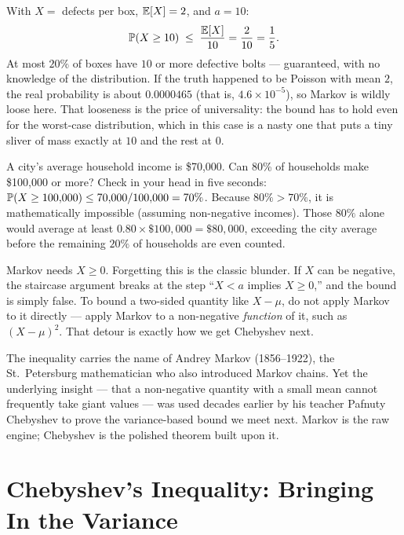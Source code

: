 \begin{example}
\label{ch19:ex-bolts}
With $X = $ defects per box, $\E[X]=2$, and $a=10$:
\[
  \P(X \ge 10) \;\le\; \frac{\E[X]}{10} = \frac{2}{10} = \frac15.
\]
At most $20\%$ of boxes have $10$ or more defective bolts --- guaranteed,
with no knowledge of the distribution. If the truth happened to be Poisson
with mean $2$, the real probability is about $0.0000465$ (that is,
$4.6\times 10^{-5}$), so Markov is wildly loose here. That looseness is the price of universality: the bound has to hold
even for the worst-case distribution, which in this case is a nasty one that
puts a tiny sliver of mass exactly at $10$ and the rest at $0$.
\end{example}

\begin{walkbox}
A city's average household income is \$70,000. Can 80\% of households make
\$100,000 or more? Check in your head in five seconds:
$\P(X \ge 100{,}000) \le 70{,}000 / 100{,}000 = 70\%$. Because $80\% > 70\%$,
it is mathematically impossible (assuming non-negative incomes). Those $80\%$
alone would average at least $0.80 \times \$100{,}000 = \$80{,}000$, exceeding
the city average before the remaining $20\%$ of households are even counted.
\end{walkbox}

\begin{trapbox}
Markov needs $X \ge 0$. Forgetting this is the classic blunder. If $X$ can be
negative, the staircase argument breaks at the step ``$X < a$ implies
$X \ge 0$,'' and the bound is simply false. To bound a two-sided quantity like
$X-\mu$, do not apply Markov to it directly --- apply Markov to a non-negative
\emph{function} of it, such as $(X-\mu)^2$. That detour is exactly how we get
Chebyshev next.
\end{trapbox}

\begin{marginnotebox}
The inequality carries the name of Andrey Markov (1856--1922), the St.\
Petersburg mathematician who also introduced Markov chains. Yet the underlying
insight --- that a non-negative quantity with a small mean cannot frequently
take giant values --- was used decades earlier by his teacher Pafnuty Chebyshev
to prove the variance-based bound we meet next. Markov is the raw engine;
Chebyshev is the polished theorem built upon it.
\end{marginnotebox}

\section{Chebyshev's Inequality: Bringing In the Variance}
\label{ch19:chebyshev}

